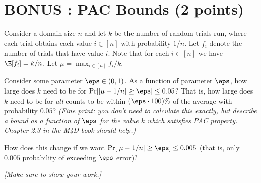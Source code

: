 \documentclass[11pt]{article}
\begin{document}
\section{BONUS : PAC Bounds (2 points)}

Consider a domain size $n$ and let $k$ be the number of random trials run, where each trial obtains each value $i \in [n]$ with probability $1/n$.  
Let $f_i$ denote the number of trials that have value $i$.  
Note that for each $i \in [n]$ we have $\E[f_i] = k/n$.  
Let $\mu = \max_{i \in [n]} f_i/k$.  

Consider some parameter $\eps \in (0,1)$.  
As a function of parameter $\eps$, how large does $k$ need to be for 
$\Pr[ |\mu - 1/n| \geq \eps] \leq 0.05$?
That is, how large does $k$ need to be for \emph{all} counts to be within $(\eps \cdot 100)\%$ of the average with probability $0.05$? 
\emph{(Fine print:  you don't need to calculate this exactly, but describe a bound as a function of $\eps$ for the value $k$ which satisfies PAC property.  Chapter 2.3 in the M4D book should help.)}

How does this change if we want
$\Pr[ |\mu - 1/n| \geq \eps] \leq 0.005$ (that is, only $0.005$ probability of exceeding $\eps$ error)?

\emph{[Make sure to show your work.]}
\end{document}
